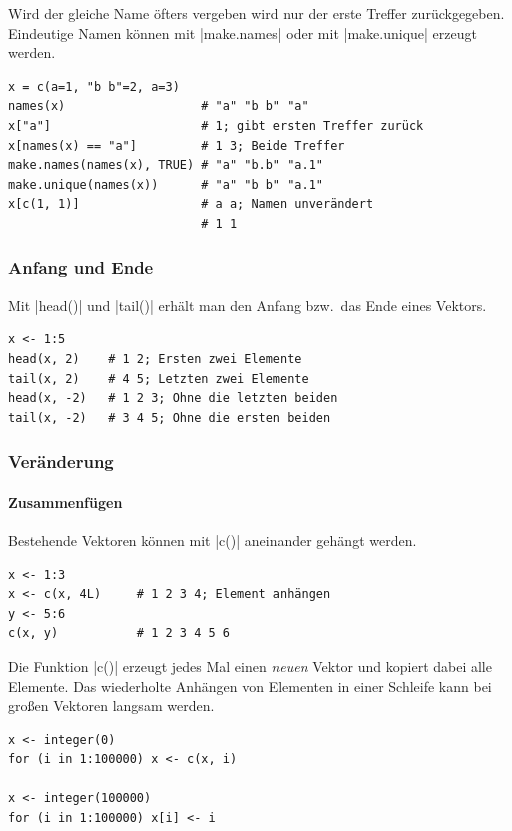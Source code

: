 \documentclass[10pt,twocolumn]{scrartcl}
\renewcommand{\lstinline}{\mycoloredinline}
\begin{document}
Wird der gleiche Name öfters vergeben wird nur der erste Treffer zurückgegeben. Eindeutige Namen können mit \lstinline|make.names| oder mit \lstinline|make.unique| erzeugt werden.

\begin{lstlisting}
x = c(a=1, "b b"=2, a=3)
names(x)                   # "a" "b b" "a"
x["a"]                     # 1; gibt ersten Treffer zurück
x[names(x) == "a"]         # 1 3; Beide Treffer
make.names(names(x), TRUE) # "a" "b.b" "a.1"
make.unique(names(x))      # "a" "b b" "a.1"
x[c(1, 1)]                 # a a; Namen unverändert
                           # 1 1
\end{lstlisting}


\subsubsection{Anfang und Ende}

Mit \lstinline|head()| und \lstinline|tail()| erhält man den Anfang bzw.\ das Ende eines Vektors.

\begin{lstlisting}
x <- 1:5
head(x, 2)    # 1 2; Ersten zwei Elemente
tail(x, 2)    # 4 5; Letzten zwei Elemente
head(x, -2)   # 1 2 3; Ohne die letzten beiden
tail(x, -2)   # 3 4 5; Ohne die ersten beiden
\end{lstlisting}


\subsubsection{Veränderung}

\paragraph{Zusammenfügen}

Bestehende Vektoren können mit \lstinline|c()| aneinander gehängt werden.

\begin{lstlisting}
x <- 1:3
x <- c(x, 4L)     # 1 2 3 4; Element anhängen
y <- 5:6
c(x, y)           # 1 2 3 4 5 6
\end{lstlisting}

Die Funktion \lstinline|c()| erzeugt jedes Mal einen \emph{neuen} Vektor und kopiert dabei alle Elemente. Das wiederholte Anhängen von Elementen in einer Schleife kann bei großen Vektoren langsam werden.

\begin{lstlisting}
x <- integer(0)
for (i in 1:100000) x <- c(x, i)

x <- integer(100000)
for (i in 1:100000) x[i] <- i
\end{lstlisting}
\end{document}
